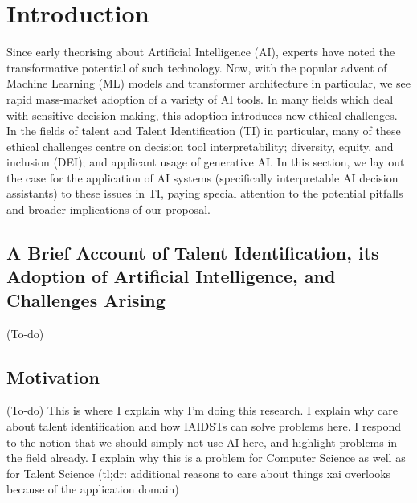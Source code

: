 

\chapter{\label{ch:intro}Introduction} 

\minitoc


Since early theorising about Artificial Intelligence (AI), experts have noted the transformative potential of such technology. Now, with the popular advent of Machine Learning (ML) models and transformer architecture in particular, we see rapid mass-market adoption of a variety of AI tools. In many fields which deal with sensitive decision-making, this adoption introduces new ethical challenges. In the fields of talent and Talent Identification (TI) in particular, many of these ethical challenges centre on decision tool interpretability; diversity, equity, and inclusion (DEI); and applicant usage of generative AI. In this section, we lay out the case for the application of AI systems (specifically interpretable AI decision assistants) to these issues in TI, paying special attention to the potential pitfalls and broader implications of our proposal.

\section{A Brief Account of Talent Identification, its Adoption of Artificial Intelligence, and Challenges Arising}
(To-do)

\section{Motivation}
(To-do) This is where I explain why I'm doing this research. I explain why care about talent identification and how IAIDSTs can solve problems here. I respond to the notion that we should simply not use AI here, and highlight problems in the field already. I explain why this is a problem for Computer Science as well as for Talent Science (tl;dr: additional reasons to care about things xai overlooks because of the application domain)

